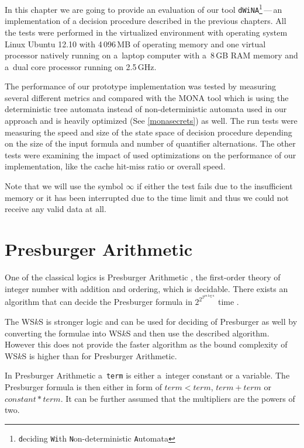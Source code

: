 In this chapter we are going to provide an evaluation of our tool
\texttt{dWiNA}\footnote{\texttt{d}eciding \texttt{Wi}th
\texttt{N}on-deterministic \texttt{A}utomata}\,---\,an implementation of
a decision procedure described in the previous chapters.
All the tests were performed in the virtualized environment with operating system Linux Ubuntu
12.10 with 4\,096\,MB of operating memory and one virtual processor natively
running on a~laptop computer with a~8\,GB RAM memory and a~dual core processor
running on 2.5\,GHz.

The performance of our prototype implementation was tested by measuring several
different metrics and compared with the \textsc{MONA} tool which is using the
deterministic tree automata instead of non-deterministic automata used in our
approach and is heavily optimized (See \ref{monasecrets}) as well.
The run tests were measuring the speed and size of the state space of
decision procedure depending on the size of the input formula and number of
quantifier alternations. The other tests were examining the impact of used
optimizations on the performance of our implementation, like the cache hit-miss
ratio or overall speed.

Note that we will use the symbol $\infty$ if either the test fails due to the
insufficient memory or it has been interrupted due to the time limit and thus we
could not receive any valid data at all.

\iffalse
\section{Presburger Arithmetic}

One of the classical logics is Presburger Arithmetic \cite{pres}, the
first-order theory of integer number with addition and ordering, which is
decidable. There exists an algorithm that can decide the Presburger formula in
$2^{2^{2^{pn\log n}}}$ time \cite{pres-time}. 

The WS$k$S is stronger logic and can be used for deciding of Presburger as well
by converting the formulae into WS$k$S and then use the described algorithm.
However this does not provide the faster algorithm as the bound complexity of
WS$k$S is higher than for Presburger Arithmetic. 

In Presburger Arithmetic a~\texttt{term} is either a~integer constant or a
variable. The Presburger formula is then either in form of $term < term$, $term
+ term$ or $constant * term$. It can be further assumed that the multipliers
are the powers of two.

